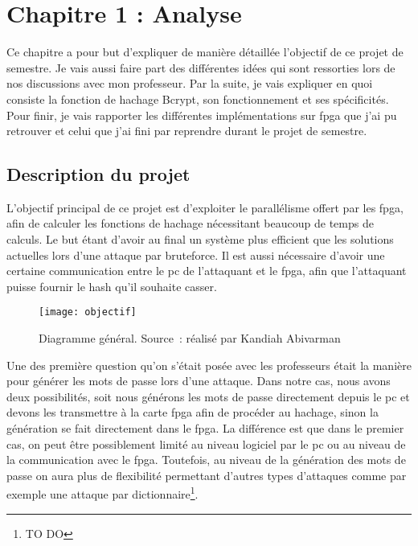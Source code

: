 \chapter{Chapitre 1 : Analyse}

Ce chapitre a pour but d'expliquer de manière détaillée l'objectif de ce projet de semestre. Je vais aussi faire part des différentes idées qui sont ressorties lors de nos discussions avec mon professeur. Par la suite, je vais expliquer en quoi consiste la fonction de hachage Bcrypt, son fonctionnement et ses spécificités. Pour finir, je vais rapporter les différentes implémentations sur \gls{fpga} que j'ai pu retrouver et celui que j'ai fini par reprendre durant le projet de semestre. 

\section{Description du projet}

L'objectif principal de ce projet est d'exploiter le parallélisme offert par les \gls{fpga}, afin de calculer les fonctions de hachage nécessitant beaucoup de temps de calculs. Le but étant d'avoir au final un système plus efficient que les solutions actuelles lors d'une attaque par bruteforce. Il est aussi nécessaire d'avoir une certaine communication entre le \gls{pc} de l'attaquant et le \gls{fpga}, afin que l'attaquant puisse fournir le hash qu'il souhaite casser.

\begin{figure}[tbph!]
	\centering
	\texttt{[image: objectif]}
	\caption[Diagramme général]{Diagramme général. Source : réalisé par Kandiah Abivarman}
	\label{fig:objectif}
\end{figure}

Une des première question qu'on s'était posée avec les professeurs était la manière pour générer les mots de passe lors d'une attaque. Dans notre cas, nous avons deux possibilités, soit nous générons les mots de passe directement depuis le \gls{pc} et devons les transmettre à la carte \gls{fpga} afin de procéder au hachage, sinon la génération se fait directement dans le \gls{fpga}. La différence est que dans le premier cas, on peut être possiblement limité au niveau logiciel par le \gls{pc} ou au niveau de la communication avec le \gls{fpga}. Toutefois, au niveau de la génération des mots de passe on aura plus de flexibilité permettant d'autres types d'attaques comme par exemple une attaque par dictionnaire\footnote{TO DO}.

